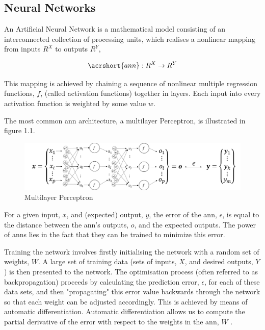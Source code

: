 \documentclass[11pt,oneside,openany,a4paper,english, report, goldenblock
]{usthesis}
\begin{document}
\subsection{Neural Networks}
An Artificial Neural Network is a mathematical model consisting of an interconnected collection of processing units, which realises a nonlinear mapping from inputs $R^X$ to outputs $R^Y$,

\begin{equation}
	\acrshort{ann}: R^X \rightarrow R^Y
\end{equation}

This mapping is achieved by chaining a sequence of nonlinear multiple regression functions, $f$, (called activation functions) together in layers.  Each input into every activation function is weighted by some value $w$.


The most common \acrshort{ann} architecture, a multilayer Perceptron, is illustrated in figure 1.1.

\begin{figure}[h]
	\centering
	\includegraphics[width=1\linewidth]{Images/Diagrams/NeuralNetwork}
	\caption[Multilayer Perceptron]{Multilayer Perceptron}
	\label{fig:neuralnetwork}
\end{figure}

For a given input, $x$, and (expected) output, $y$, the error of the \acrshort{ann}, $ \epsilon $, is equal to the distance between the \acrshort{ann}'s outputs, $o$, and the expected outputs. The power of \acrshort{ann}s lies in the fact that they can be trained to minimize this error. 


Training the network involves firstly initialising the network with a random set of weights, $W$. A large set of training data (sets of inputs, $X$, and desired outputs, $Y$) is then presented to the network. The optimisation process (often referred to as backpropagation) proceeds by calculating the prediction error, $ \epsilon $, for each of these data sets, and then "propagating" this error value backwards through the network so that each weight can be adjusted accordingly. This is achieved by means of automatic differentiation. Automatic differentiation allows us to compute the partial derivative of the error with respect to the weights in the \acrshort{ann}, $W$ \citep{Werbos}.
\end{document}
